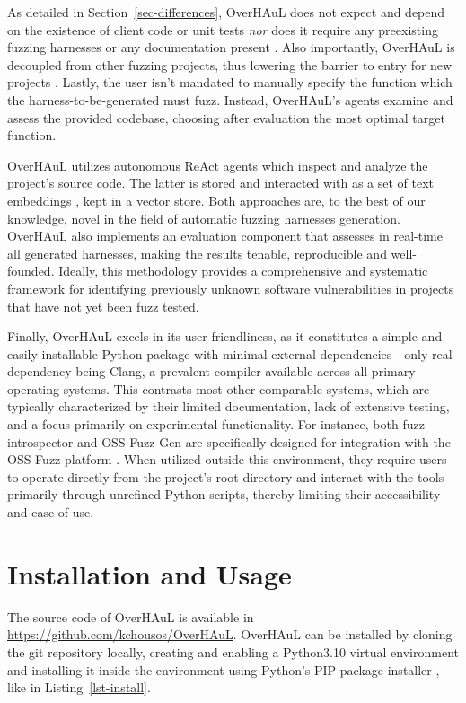 \documentclass[
  a4paper,
]{scrreprt}
\theoremstyle{definition}
\theoremstyle{remark}
\begin{document}
As detailed in Section~\ref{sec-differences}, OverHAuL does not expect
and depend on the existence of client code or unit tests
\autocite{utopia,fudge,fuzzgen} \emph{nor} does it require any
preexisting fuzzing harnesses \autocite{oss-fuzz-gen} or any
documentation present \autocite{sun2024}. Also importantly, OverHAuL is
decoupled from other fuzzing projects, thus lowering the barrier to
entry for new projects \autocite{oss-fuzz-gen,oss-fuzz}. Lastly, the
user isn't mandated to manually specify the function which the
harness-to-be-generated must fuzz. Instead, OverHAuL's agents examine
and assess the provided codebase, choosing after evaluation the most
optimal target function.

OverHAuL utilizes autonomous ReAct agents which inspect and analyze the
project's source code. The latter is stored and interacted with as a set
of text embeddings \autocite{mikolov2013}, kept in a vector store. Both
approaches are, to the best of our knowledge, novel in the field of
automatic fuzzing harnesses generation. OverHAuL also implements an
evaluation component that assesses in real-time all generated harnesses,
making the results tenable, reproducible and well-founded. Ideally, this
methodology provides a comprehensive and systematic framework for
identifying previously unknown software vulnerabilities in projects that
have not yet been fuzz tested.

Finally, OverHAuL excels in its user-friendliness, as it constitutes a
simple and easily-installable Python package with minimal external
dependencies---only real dependency being Clang, a prevalent compiler
available across all primary operating systems. This contrasts most
other comparable systems, which are typically characterized by their
limited documentation, lack of extensive testing, and a focus primarily
on experimental functionality. For instance, both fuzz-introspector and
OSS-Fuzz-Gen are specifically designed for integration with the OSS-Fuzz
platform \autocite{fuzz-introspector,oss-fuzz-gen,oss-fuzz}. When
utilized outside this environment, they require users to operate
directly from the project's root directory and interact with the tools
primarily through unrefined Python scripts, thereby limiting their
accessibility and ease of use.

\section{Installation and Usage}\label{sec-install}

The source code of OverHAuL is available in
\url{https://github.com/kchousos/OverHAuL}. OverHAuL can be installed by
cloning the git repository locally, creating and enabling a Python3.10
virtual environment \autocite{venv} and installing it inside the
environment using Python's PIP package installer \autocite{pip}, like in
Listing~\ref{lst-install}.
\end{document}
